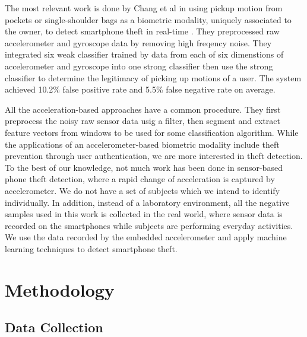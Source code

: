 \documentclass{soups}
\begin{document}
The most relevant work is done by Chang et al in using pickup motion from pockets or single-shoulder bags as a biometric modality, uniquely associated to the owner, to detect smartphone theft in real-time \cite{cheng:theft}. They preprocessed raw accelerometer and gyroscope data by removing high freqency noise. They integrated six weak classifier trained by data from each of six dimenstions of accelerometer and gyroscope into one strong classifier then use the strong classifier to determine the legitimacy of picking up motions of a user. The system achieved 10.2\% false positive rate and 5.5\% false negative rate on average.

All the acceleration-based approaches have a common procedure. They first preprocess the noisy raw sensor data usig a filter, then segment and extract feature vectors from windows to be used for some classification algorithm. While the applications of an accelerometer-based biometric modality include theft prevention through user authentication, we are more interested in theft detection. To the best of our knowledge, not much work has been done in sensor-based phone theft detection, where a rapid change of acceleration is captured by accelerometer. We do not have a set of subjects which we intend to identify individually. In addition, instead of a laboratory environment, all the negative samples used in this work is collected in the real world, where sensor data is recorded on the smartphones while subjects are performing everyday activities. We use the data recorded by the embedded accelerometer and apply machine learning techniques to detect smartphone theft.




\section{Methodology}

\subsection{Data Collection}
\end{document}
